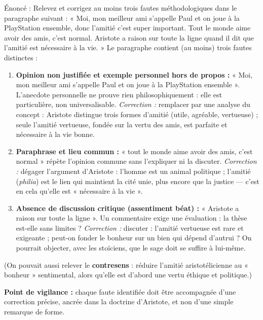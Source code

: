 \documentclass[11pt]{article}
\begin{document}
\begin{exoresolu}
Énoncé : Relevez et corrigez au moins trois fautes méthodologiques dans le paragraphe suivant :
« Moi, mon meilleur ami s'appelle Paul et on joue à la PlayStation ensemble, donc l'amitié c'est super important. Tout le monde aime avoir des amis, c'est normal. Aristote a raison sur toute la ligne quand il dit que l'amitié est nécessaire à la vie. »
\tcblower
Le paragraphe contient (au moins) trois fautes distinctes :

\begin{enumerate}
\item \textbf{Opinion non justifiée et exemple personnel hors de propos :} « Moi, mon meilleur ami s'appelle Paul et on joue à la PlayStation ensemble ». L'anecdote personnelle ne prouve rien philosophiquement : elle est particulière, non universalisable. \emph{Correction :} remplacer par une analyse du concept : Aristote distingue trois formes d'amitié (utile, agréable, vertueuse) ; seule l'amitié vertueuse, fondée sur la vertu des amis, est parfaite et nécessaire à la vie bonne.

\item \textbf{Paraphrase et lieu commun :} « tout le monde aime avoir des amis, c'est normal » répète l'opinion commune sans l'expliquer ni la discuter. \emph{Correction :} dégager l'argument d'Aristote : l'homme est un animal politique ; l'amitié (\emph{philia}) est le lien qui maintient la cité unie, plus encore que la justice — c'est en cela qu'elle est « nécessaire à la vie ».

\item \textbf{Absence de discussion critique (assentiment béat) :} « Aristote a raison sur toute la ligne ». Un commentaire exige une évaluation : la thèse est-elle sans limites ? \emph{Correction :} discuter : l'amitié vertueuse est rare et exigeante ; peut-on fonder le bonheur sur un bien qui dépend d'autrui ? On pourrait objecter, avec les stoïciens, que le sage doit se suffire à lui-même.
\end{enumerate}

(On pouvait aussi relever le \textbf{contresens} : réduire l'amitié aristotélicienne au « bonheur » sentimental, alors qu'elle est d'abord une vertu éthique et politique.)

\textbf{Point de vigilance :} chaque faute identifiée doit être accompagnée d'une correction précise, ancrée dans la doctrine d'Aristote, et non d'une simple remarque de forme.
\end{exoresolu}
\end{document}

